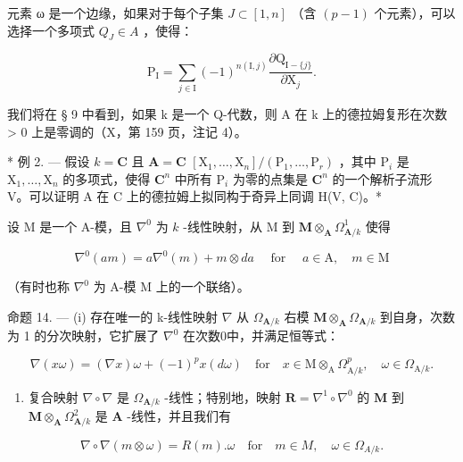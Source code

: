 元素 ω 是一个边缘，如果对于每个子集 \(J \subset [1, n]\) （含 \((p - 1)\) 个元素），可以选择一个多项式 \(Q_{J} \in A\) ，使得：

\[
\mathrm{P} _ {\mathrm{I}} = \sum_ {j \in \mathrm{I}} (- 1) ^ {n (\mathrm{I}, j)} \frac {\partial \mathrm{Q} _ {\mathrm{I} - \{j \}}}{\partial \mathrm{X} _ {j}}.
\]

我们将在 § 9 中看到，如果 k 是一个 Q-代数，则 A 在 k 上的德拉姆复形在次数 \textgreater{} 0 上是零调的（X，第 159 页，注记 4）。

* 例 2. --- 假设 \(k = \mathbf{C}\) 且 \(\mathbf{A} = \mathbf{C}\) \([\mathrm{X}_1, \ldots, \mathrm{X}_n] / (\mathrm{P}_1, \ldots, \mathrm{P}_r)\) ，其中 \(\mathrm{P}_i\) 是 \(\mathrm{X}_1, \ldots, \mathrm{X}_n\) 的多项式，使得 \(\mathbf{C}^n\) 中所有 \(\mathrm{P}_i\) 为零的点集是 \(\mathbf{C}^n\) 的一个解析子流形 V。可以证明 A 在 C 上的德拉姆上拟同构于奇异上同调 H(V, C)。*

设 M 是一个 A-模，且 \(\nabla^{0}\) 为 \(k\) -线性映射，从 M 到 \(\mathbf{M} \otimes_{\mathbf{A}} \Omega_{\mathbf{A}/k}^{1}\) 使得

\[
\nabla^ {0} (a m) = a \nabla^ {0} (m) + m \otimes d a \quad \text { for } \quad a \in \mathrm{A}, \quad m \in \mathrm{M}\tag{13}
\]

（有时也称 \(\nabla^{0}\) 为 A-模 M 上的一个联络）。

命题 14. --- (i) 存在唯一的 k-线性映射 \(\nabla\) 从 \(\Omega_{\mathbf{A}/k}\) 右模 \(\mathbf{M} \otimes_{\mathbf{A}} \Omega_{\mathbf{A}/k}\) 到自身，次数为 1 的分次映射，它扩展了 \(\nabla^{0}\) 在次数0中，并满足恒等式：

\[
\nabla (x \omega) = (\nabla x) \omega + (- 1) ^ {p} x (d \omega) \quad \mathrm{for} \quad x \in \mathrm{M} \otimes_ {\mathrm{A}} \Omega_ {\mathrm{A} / k} ^ {p}, \quad \omega \in \Omega_ {\mathrm{A} / k}. \tag {14}
\]

\begin{enumerate}
\def\labelenumi{(\roman{enumi})}
\setcounter{enumi}{1}
\tightlist
\item
  复合映射 \(\nabla \circ \nabla\) 是 \(\Omega_{\mathbf{A} / k}\) -线性；特别地，映射 \(\mathbf{R} = \nabla^{1} \circ \nabla^{0}\) 的 \(\mathbf{M}\) 到 \(\mathbf{M} \otimes_{\mathbf{A}} \Omega_{\mathbf{A} / k}^{2}\) 是 \(\mathbf{A}\) -线性，并且我们有
\end{enumerate}

\[
\nabla \circ \nabla (m \otimes \omega) = R (m). \omega \quad \mathrm{for} \quad m \in M, \quad \omega \in \Omega_ {A / k}.
\]

